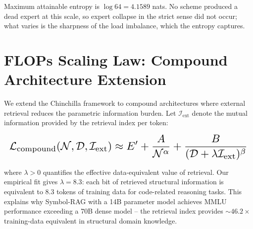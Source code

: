 \documentclass[10pt,journal,compsoc,twocolumn]{IEEEtran}
\begin{document}
Maximum attainable entropy is $\log 64 = 4.1589$ nats. No scheme produced a dead expert at this scale, so expert collapse in the strict sense did not occur; what varies is the sharpness of the load imbalance, which the entropy captures.



\section{FLOPs Scaling Law: Compound Architecture Extension}


We extend the Chinchilla framework to compound architectures where external retrieval reduces the parametric information burden. Let $\mathcal{I}_{\text{ext}}$ denote the mutual information provided by the retrieval index per token:



























\begin{equation}
\resizebox{\columnwidth}{!}{$\displaystyle
\begin{aligned}
\mathcal{L}_{\text{compound}}(\mathcal{N}, \mathcal{D}, \mathcal{I}_{\text{ext}}) \approx E' + \frac{A}{\mathcal{N}^\alpha} + \frac{B}{(\mathcal{D} + \lambda\mathcal{I}_{\text{ext}})^\beta}
\end{aligned}
$}
\end{equation}



























where $\lambda > 0$ quantifies the effective data-equivalent value of retrieval. Our empirical fit gives $\lambda = 8.3$: each bit of retrieved structural information is equivalent to 8.3 tokens of training data for code-related reasoning tasks. This explains why Symbol-RAG with a 14B parameter model achieves MMLU performance exceeding a 70B dense model -- the retrieval index provides $\sim 46.2\times$ training-data equivalent in structural domain knowledge.
\end{document}

